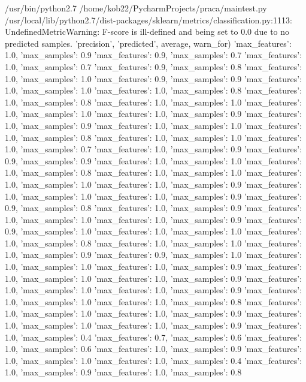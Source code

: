/usr/bin/python2.7 /home/kob22/PycharmProjects/praca/maintest.py
/usr/local/lib/python2.7/dist-packages/sklearn/metrics/classification.py:1113: UndefinedMetricWarning: F-score is ill-defined and being set to 0.0 due to no predicted samples.
  'precision', 'predicted', average, warn_for)
{'max_features': 1.0, 'max_samples': 0.9}
{'max_features': 0.9, 'max_samples': 0.7}
{'max_features': 1.0, 'max_samples': 0.7}
{'max_features': 0.9, 'max_samples': 0.8}
{'max_features': 1.0, 'max_samples': 1.0}
{'max_features': 0.9, 'max_samples': 0.9}
{'max_features': 1.0, 'max_samples': 1.0}
{'max_features': 1.0, 'max_samples': 0.8}
{'max_features': 1.0, 'max_samples': 0.8}
{'max_features': 1.0, 'max_samples': 1.0}
{'max_features': 1.0, 'max_samples': 1.0}
{'max_features': 1.0, 'max_samples': 0.9}
{'max_features': 1.0, 'max_samples': 0.9}
{'max_features': 1.0, 'max_samples': 1.0}
{'max_features': 1.0, 'max_samples': 0.8}
{'max_features': 1.0, 'max_samples': 1.0}
{'max_features': 1.0, 'max_samples': 0.7}
{'max_features': 1.0, 'max_samples': 0.9}
{'max_features': 0.9, 'max_samples': 0.9}
{'max_features': 1.0, 'max_samples': 1.0}
{'max_features': 1.0, 'max_samples': 0.8}
{'max_features': 1.0, 'max_samples': 1.0}
{'max_features': 1.0, 'max_samples': 1.0}
{'max_features': 1.0, 'max_samples': 0.9}
{'max_features': 1.0, 'max_samples': 1.0}
{'max_features': 1.0, 'max_samples': 0.9}
{'max_features': 0.9, 'max_samples': 0.8}
{'max_features': 1.0, 'max_samples': 0.9}
{'max_features': 1.0, 'max_samples': 1.0}
{'max_features': 1.0, 'max_samples': 0.9}
{'max_features': 0.9, 'max_samples': 1.0}
{'max_features': 1.0, 'max_samples': 1.0}
{'max_features': 1.0, 'max_samples': 0.8}
{'max_features': 1.0, 'max_samples': 1.0}
{'max_features': 1.0, 'max_samples': 0.9}
{'max_features': 0.9, 'max_samples': 1.0}
{'max_features': 1.0, 'max_samples': 1.0}
{'max_features': 1.0, 'max_samples': 0.9}
{'max_features': 1.0, 'max_samples': 1.0}
{'max_features': 1.0, 'max_samples': 0.9}
{'max_features': 1.0, 'max_samples': 1.0}
{'max_features': 1.0, 'max_samples': 0.9}
{'max_features': 1.0, 'max_samples': 1.0}
{'max_features': 1.0, 'max_samples': 0.8}
{'max_features': 1.0, 'max_samples': 1.0}
{'max_features': 1.0, 'max_samples': 0.9}
{'max_features': 1.0, 'max_samples': 1.0}
{'max_features': 1.0, 'max_samples': 0.9}
{'max_features': 1.0, 'max_samples': 0.4}
{'max_features': 0.7, 'max_samples': 0.6}
{'max_features': 1.0, 'max_samples': 0.6}
{'max_features': 1.0, 'max_samples': 0.9}
{'max_features': 1.0, 'max_samples': 1.0}
{'max_features': 1.0, 'max_samples': 0.4}
{'max_features': 1.0, 'max_samples': 0.9}
{'max_features': 1.0, 'max_samples': 0.8}

